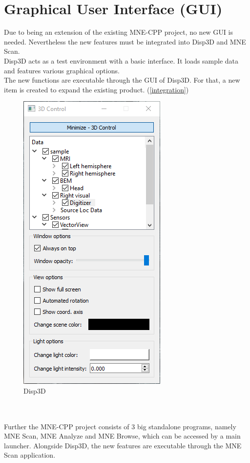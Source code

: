 \section{Graphical User Interface (GUI)}

Due to being an extension of the existing MNE-CPP project, no new GUI is needed. Nevertheless the new features must be integrated into Disp3D and MNE Scan. \\

Disp3D acts as a test environment with a basic interface. It loads sample data and features various graphical options. \\
The new functions are executable through the GUI of Disp3D. For that, a new item is created to expand the existing product. (\ref{integration}) \\ 
	
\begin{figure}
	
	\begin{center}
		
		\includegraphics[scale=0.5]{Figures/Disp3D.PNG}
	
	\end{center}
	
	\caption{Disp3D}

\end{figure}
~\\
~\\
Further the MNE-CPP project consists of 3 big standalone programs, namely MNE Scan, MNE Analyze and MNE Browse, which can be accessed by a main launcher. Alongside Disp3D, the new features are executable through the MNE Scan application.

